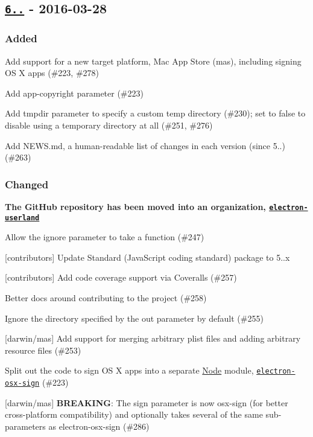 \subsection*{\href{https://github.com/electron-userland/electron-packager/compare/v5.2.1...v6.0.0}{\tt 6..} -\/ 2016-\/03-\/28}

\subsubsection*{Added}


\begin{DoxyItemize}
\item Add support for a new target platform, Mac App Store ({\ttfamily mas}), including signing OS X apps (\#223, \#278)
\item Add {\ttfamily app-\/copyright} parameter (\#223)
\item Add {\ttfamily tmpdir} parameter to specify a custom temp directory (\#230); set to {\ttfamily false} to disable using a temporary directory at all (\#251, \#276)
\item Add {\ttfamily N\+E\+W\+S.\+md}, a human-\/readable list of changes in each version (since 5..) (\#263)
\end{DoxyItemize}

\subsubsection*{Changed}


\begin{DoxyItemize}
\item {\bfseries The Git\+Hub repository has been moved into an organization, \href{https://github.com/electron-userland}{\tt electron-\/userland}}
\item Allow the {\ttfamily ignore} parameter to take a function (\#247)
\item \mbox{[}contributors\mbox{]} Update Standard (Java\+Script coding standard) package to 5..\+x
\item \mbox{[}contributors\mbox{]} Add code coverage support via Coveralls (\#257)
\item Better docs around contributing to the project (\#258)
\item Ignore the directory specified by the {\ttfamily out} parameter by default (\#255)
\item \mbox{[}darwin/mas\mbox{]} Add support for merging arbitrary plist files and adding arbitrary resource files (\#253)
\item Split out the code to sign OS X apps into a separate \mbox{\hyperlink{classNode}{Node}} module, \href{https://github.com/electron-userland/electron-osx-sign}{\tt electron-\/osx-\/sign} (\#223)
\item \mbox{[}darwin/mas\mbox{]} {\bfseries B\+R\+E\+A\+K\+I\+NG}\+: The {\ttfamily sign} parameter is now {\ttfamily osx-\/sign} (for better cross-\/platform compatibility) and optionally takes several of the same sub-\/parameters as electron-\/osx-\/sign (\#286)
\end{DoxyItemize}

